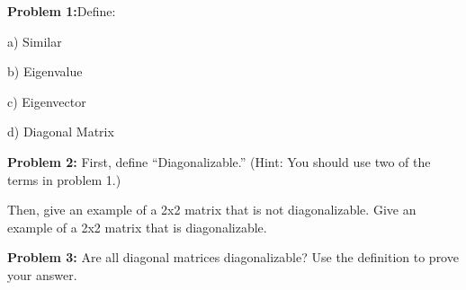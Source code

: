 \documentclass[a4paper,12pt]{article}
\begin{document}
{\Large{\bf Problem 1:}}Define:

a) Similar

b) Eigenvalue

c) Eigenvector

d) Diagonal Matrix

\shunt

{\Large{\bf Problem 2:}} First, define ``Diagonalizable.'' (Hint: You should use two of the terms in problem 1.)

Then, give an example of a 2x2 matrix that is not diagonalizable. Give an example of a 2x2 matrix that is diagonalizable.

\shunt

{\Large{\bf Problem 3:}} Are all diagonal matrices diagonalizable? Use the definition to prove your answer.

\shunt
\end{document}
